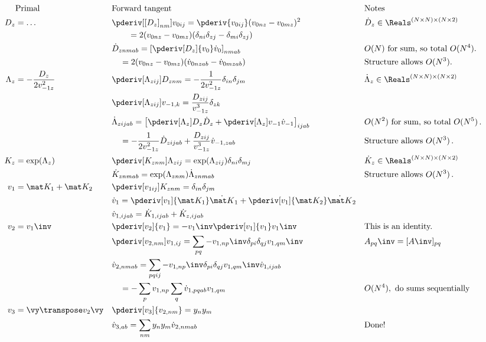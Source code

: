 \begin{align}
&\text{Primal} && \text{Forward tangent} && \text{Notes} \nonumber \\
D_z &= \dots && \pderiv[{[D_z]}_{nm}]{v_{0ij}} = \pderiv{v_{0ij}} (v_{0nz} - v_{0mz})^2 &&  \dot D_z \in \Reals^{(N\times N) \times (N\times 2)}  \nonumber \\
& && \qquad = 2(v_{0nz} - v_{0mz})(\delta_{ni}\delta_{zj} - \delta_{mi}\delta_{zj}) &&\\
& && \dot D_{znmab} = \left[\pderiv[D_z]{v_0} \dot v_0\right]_{nmab} && O(N) \text{ for sum, so total } O(N^4). \\
& && \quad = 2 (v_{0nz} - v_{0mz}) (\dot v_{0nzab} - \dot v_{0mzab})&& \text{Structure allows } O(N^3). \\
\Lambda_z &= - \frac{D_z}{2v_{-1z}^2} && \pderiv[\Lambda_{zij}]{D_{znm}} = - \frac{1}{2v_{-1z}^2}\delta_{in}\delta_{jm}  && \dot \Lambda_z \in \Reals^{(N\times N) \times (N\times 2)} \\
& && \pderiv[\Lambda_{zij}]{v_{-1,k}} = \frac{D_{zij}}{v_{-1z}^3} \delta_{zk} && \\
& && \dot \Lambda_{zijab} = \left[\pderiv[\Lambda_{z}]{D_{z}} \dot D_{z} + \pderiv[\Lambda_{z}]{v_{-1}} \dot v_{-1}\right]_{ijab} && O(N^2)\text{ for sum, so total }O(N^5)\,. \\
& && \quad = - \frac{1}{2v_{-1z}^2} \dot D_{zijab} + \frac{D_{zij}}{v_{-1z}^3} \dot v_{-1,zab} && \text{Structure allows } O(N^3)\,. \\
K_z &= \exp(\Lambda_z) && \pderiv[K_{znm}]{\Lambda_{zij}} = \exp(\Lambda_{zij})\delta_{ni}\delta_{mj} && \dot K_z \in \Reals^{(N\times N)\times (N\times 2)} \\
& && \dot K_{znmab} = \exp(\Lambda_{znm})\dot\Lambda_{znmab} && \text{Structure allows } O(N^3)\,. \\
v_1 &= \mat K_1 + \mat K_2 && \pderiv[v_{1ij}]{K_{znm}} = \delta_{in}\delta_{jm} && \\
& && \dot v_1 = \pderiv[v_1]{\mat K_1} \dot{\mat K}_1 + \pderiv[v_1]{\mat K_2} \dot{\mat K}_2 && \\
& && \dot v_{1,ijab} =  \dot K_{1,ijab} + \dot K_{z,ijab} && \\
v_2&= v_1\inv && \pderiv[v_2]{v_1} = -v_1\inv \pderiv[v_1]{v_1}v_1\inv && \text{This is an identity.} \\
& && \pderiv[v_{2,nm}]{v_{1,ij}} = \sum_{pq}-v_{1,np}\inv \delta_{pi}\delta_{qj} v_{1,qm}\inv && A_{pq}\inv = [A\inv]_{pq} \\
& && \dot v_{2,nmab} = \sum_{pqij} -v_{1,np}\inv \delta_{pi}\delta_{qj} v_{1,qm}\inv \dot v_{1,ijab} && \\
& && \quad = -\sum_{p} v_{1,np} \sum_q \dot v_{1,pqab} v_{1,qm} && O(N^4), \text{ do sums sequentially} \\
v_3 &= \vy\transpose v_2 \vy && \pderiv[v_3]{v_{2,nm}} = y_ny_m  && \\
& &&\dot v_{3,ab} = \sum_{nm} y_ny_m \dot v_{2,nmab} && \text{Done!}
\end{align}

